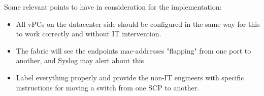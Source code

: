     Some relevant points to have in consideration for the implementation:
    \begin{itemize}
      \item All vPCs on the datacenter side should be configured in the same way for this to work correctly and without IT intervention.  
      \item The fabric will see the endpoints mac-addresses "flapping" from one port to another, and Syslog may alert about this 
      \item Label everything properly and provide the non-IT engineers with specific instructions for moving a switch from one SCP to another.    \end{itemize}



